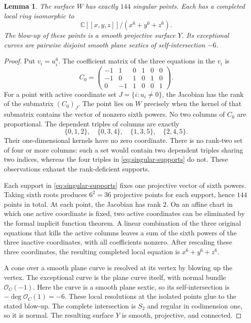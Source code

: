 \documentclass[11pt,reqno]{amsart}
\numberwithin{equation}{section}
\newtheorem{lemma}[theorem]{Lemma}
\theoremstyle{definition}
\theoremstyle{remark}
\newcommand{\C}{\mathbb C}
\newcommand{\OO}{\mathcal O}
\begin{document}
\begin{lemma}\label{lem:singular-points}
The surface $W$ has exactly $144$ singular points. Each has a completed
local ring isomorphic to
\[
 \C[[x,y,z]]/(x^6+y^6+z^6).
\]
The blow-up of these points is a smooth projective surface $Y$. Its
exceptional curves are pairwise disjoint smooth plane sextics of
self-intersection $-6$.
\end{lemma}

\begin{proof}
Put $v_i=u_i^6$. The coefficient matrix of the three equations in the
$v_i$ is
\begin{equation}\label{eq:matrix}
 C_0=\begin{pmatrix}
 -1&1&0&1&0&0\\
 -1&0&1&0&1&0\\
 0&-1&1&0&0&1
 \end{pmatrix}.
\end{equation}
For a point with active coordinate set $J=\{i:u_i\ne0\}$, the
Jacobian has the rank of the submatrix $(C_0)_J$. The point lies on
$W$ precisely when the kernel of that submatrix contains the vector
of nonzero sixth powers. No two columns of $C_0$ are proportional.
The dependent triples of columns are exactly
\begin{equation}\label{eq:singular-supports}
 \{0,1,2\},\quad\{0,3,4\},\quad
 \{1,3,5\},\quad\{2,4,5\}.
\end{equation}
Their one-dimensional kernels have no zero coordinate. There is no
rank-two set of four or more columns: such a set would contain two
dependent triples sharing two indices, whereas the four triples in
\eqref{eq:singular-supports} do not. These observations exhaust the
rank-deficient supports.

Each support in \eqref{eq:singular-supports} fixes one projective vector
of sixth powers. Taking sixth roots produces $6^2=36$ projective
points for each support, hence $144$ points in total. At each point,
the Jacobian has rank $2$. On an affine chart in which one active
coordinate is fixed, two active coordinates can be eliminated by the
formal implicit function theorem. A linear combination of the three
original equations that kills the active columns leaves a sum of the
sixth powers of the three inactive coordinates, with all coefficients
nonzero. After rescaling these three coordinates, the resulting
completed local equation is $x^6+y^6+z^6$.

A cone over a smooth plane curve is resolved at its vertex by blowing
up the vertex. The exceptional curve is the plane curve itself, with
normal bundle $\OO_C(-1)$. Here the curve is a smooth plane sextic,
so its self-intersection is $-\deg\OO_C(1)=-6$.
These local resolutions at the isolated points glue to the stated
blow-up. The complete intersection is $S_2$ and regular in codimension
one, so it is normal. The resulting surface $Y$ is smooth, projective,
and connected.
\end{proof}
\end{document}
